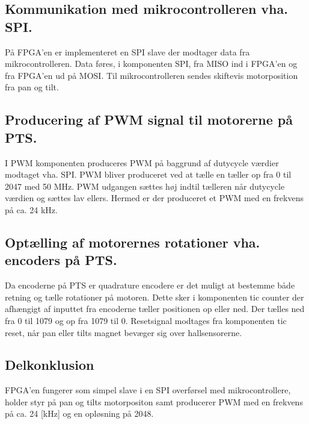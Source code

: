 \subsection{Kommunikation med mikrocontrolleren vha. SPI.}
På FPGA'en er implementeret en SPI slave der modtager data fra 
mikrocontrolleren. Data føres, i komponenten SPI, fra MISO ind i FPGA'en og fra FPGA'en ud på 
MOSI. Til mikrocontrolleren sendes skiftevis motorposition fra pan og tilt.

\subsection{Producering af PWM signal til motorerne på PTS.}
I PWM komponenten produceres PWM på baggrund af dutycycle værdier modtaget vha. SPI. 
PWM bliver produceret ved at tælle en tæller op fra 0 til 2047 med 50 MHz.
PWM udgangen sættes høj indtil tælleren når dutycycle værdien og sættes lav 
ellers. Hermed er der produceret et PWM med en frekvens på ca. 24 kHz.

\subsection{Optælling af motorernes rotationer vha. encoders på PTS.}
Da encoderne på PTS er quadrature encodere er det muligt at bestemme både retning og tælle rotationer på motoren. 
Dette sker i komponenten tic counter der afhængigt af inputtet fra encoderne tæller positionen op eller 
ned.
Der tælles ned fra 0 til 1079 og op fra 1079 til 0.
Resetsignal modtages fra komponenten tic reset, når pan eller tilts magnet bevæger 
sig over hallsensorerne.

\subsection{Delkonklusion}
FPGA'en fungerer som simpel slave i en SPI overførsel med mikrocontrollere, holder styr på pan og tilts motorpositon samt producerer PWM 
med en frekvens på ca. 24 [kHz] og en opløsning på 2048.